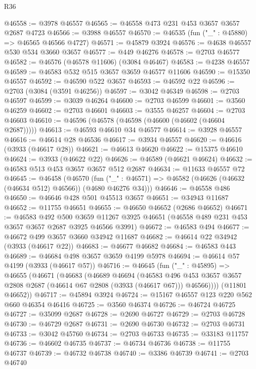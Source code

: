 \begin{lexlean}{R36}
\begin{coremodule}
@46558 := @3978 @46557
@46565 := @46558 @473 @231 @453 @3657 @3657 @2687 @4723
@46566 := @3988 @46557
@46570 := @46535 (fun ("_" : @45880) => @46565 @46566 @4727)
@46571 := @45879 @3924
@46576 := @4638 @46557 @530 @534 @3660 @3657
@46577 := @449 @46276
@46578 := @2703 @46577
@46582 := @46576 (@46578 @11606) (@3084 @46467)
@46583 := @4238 @46557
@46589 := @46583 @532 @515 @3657 @3659 @46577 @11606
@46590 := @15350 @46557
@46592 := @46590 @522 @3657
@46593 := @46592 @22
@46596 := @2703 (@3084 (@3591 @46256))
@46597 := @3042 @46349
@46598 := @2703 @46597
@46599 := @3039 @46264
@46600 := @2703 @46599
@46601 := @3560 @46259
@46602 := @2703 @46601
@46603 := @3555 @46257
@46604 := @2703 @46603
@46610 := @46596 (@46578 (@46598 (@46600 (@46602 (@46604 @2687)))))
@46613 := @46593 @46610 @34 @46577
@46614 := @3928 @46557
@46616 := @46614 @28 @46536
@46617 := @3934 @46557
@46620 := @46616 (@3933 (@46617 @28))
@46621 := @46613 @46620
@46622 := @15375 @46610
@46624 := @3933 (@46622 @22)
@46626 := @46589 (@46621 @46624)
@46632 := @46583 @513 @453 @3657 @3657 @512 @2687
@46634 := @11633 @46557 @72
@46645 := @46458
    (@46570
      (fun ("_" : @46571) => @46582 (@46626 (@46632 (@46634 @512) @46566)) (@4680 @46276 @34)))
@46646 := @46558 @486
@46650 := @46646 @428 @501 @45513 @3657
@46651 := @34943 @11687
@46652 := @11755 @46651
@46655 := @46650 @46652 (@2686 @46652)
@46671 := @46583
    @492
    @500
    @3659
    @11267
    @3925
    @46651
    (@46558 @489 @231 @453 @3657 @3657 @2687 @3925 @46566 @3991)
@46672 := @46583 @494
@46677 := @46672 @499 @3657 @3660 @34942 @11687
@46682 := @46614 @22 @34942 (@3933 (@46617 @22))
@46683 := @46677 @46682
@46684 := @46583 @443
@46689 := @46684 @498 @3657 @3659 @4199 @5978
@46694 := @46614 @57 @4199 (@3933 (@46617 @57))
@46716 := @46645
    (fun ("_" : @45895) =>
    @46655
      (@46671
        (@46683
          (@46689
            @46694
            (@46583
              @496
              @453
              @3657
              @3657
              @2808
              @2687
              (@46614 @67 @2808 (@3933 (@46617 @67)))
              @46566))))
      (@11801 @46652))
@46717 := @45894 @3924
@46724 := @15167 @46557 @123 @220 @562 @660 @46354 @46416
@46725 := @3560 @46374
@46726 := @46724 @46725
@46727 := @35099 @2687
@46728 := @2690 @46727
@46729 := @2703 @46728
@46730 := @46729 @2687
@46731 := @2690 @46730
@46732 := @2703 @46731
@46733 := @3042 @45760
@46734 := @2703 @46733
@46735 := @33183 @11757
@46736 := @46602 @46735
@46737 := @46734 @46736
@46738 := @11755 @46737
@46739 := @46732 @46738
@46740 := @3386 @46739
@46741 := @2703 @46740

\end{coremodule}
\end{lexlean}

